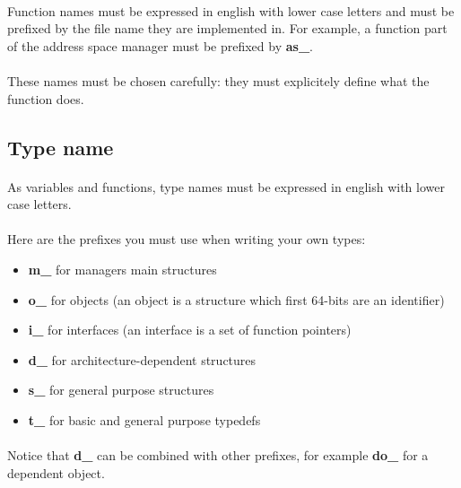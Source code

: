 \paragraph{}
Function names  must be expressed  in english with lower  case letters
and must  be prefixed by  the file name  they are implemented  in. For
example, a function part of the address space manager must be prefixed
by \textbf{as\_}.

\paragraph{}
These  names must be  chosen carefully:  they must  explicitely define
what the function does.

\subsection*{Type name}

\paragraph{}
As variables  and functions, type  names must be expressed  in english
with lower case letters.

\paragraph{}
Here are the prefixes you must use when writing your own types:

\begin{itemize}
\item \textbf{m\_} for managers main structures
\item \textbf{o\_} for  objects (an object is a  structure which first
64-bits are an identifier)
\item \textbf{i\_} for interfaces (an interface is a set of function pointers)
\item \textbf{d\_} for architecture-dependent structures
\item \textbf{s\_} for general purpose structures
\item \textbf{t\_} for basic and general purpose typedefs
\end{itemize}

\paragraph{}
Notice  that \textbf{d\_}  can be  combined with  other  prefixes, for
example \textbf{do\_} for a dependent object.

